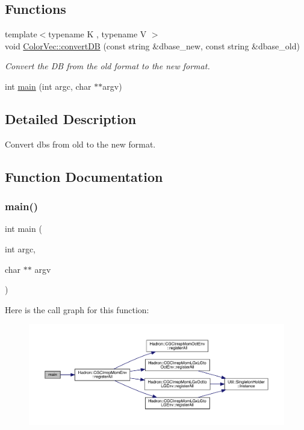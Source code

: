 \subsection*{Functions}
\begin{DoxyCompactItemize}
\item 
{\footnotesize template$<$typename K , typename V $>$ }\\void \mbox{\hyperlink{namespaceColorVec_a2de43a353cb0439d273dacf739397303}{Color\+Vec\+::convert\+DB}} (const string \&dbase\+\_\+new, const string \&dbase\+\_\+old)
\begin{DoxyCompactList}\small\item\em Convert the DB from the old format to the new format. \end{DoxyCompactList}\item 
int \mbox{\hyperlink{adat-devel_2main_2dbutil_2dbconvert_8cc_a3c04138a5bfe5d72780bb7e82a18e627}{main}} (int argc, char $\ast$$\ast$argv)
\end{DoxyCompactItemize}


\subsection{Detailed Description}
Convert dbs from old to the new format. 



\subsection{Function Documentation}
\mbox{\label{adat-devel_2main_2dbutil_2dbconvert_8cc_a3c04138a5bfe5d72780bb7e82a18e627}} 
\subsubsection{\texorpdfstring{main()}{main()}}
{\footnotesize\ttfamily int main (\begin{DoxyParamCaption}\item[{int}]{argc,  }\item[{char $\ast$$\ast$}]{argv }\end{DoxyParamCaption})}

Here is the call graph for this function\+:
\nopagebreak
\begin{figure}[H]
\begin{center}
\leavevmode
\includegraphics[width=350pt]{d5/db9/adat-devel_2main_2dbutil_2dbconvert_8cc_a3c04138a5bfe5d72780bb7e82a18e627_cgraph}
\end{center}
\end{figure}
